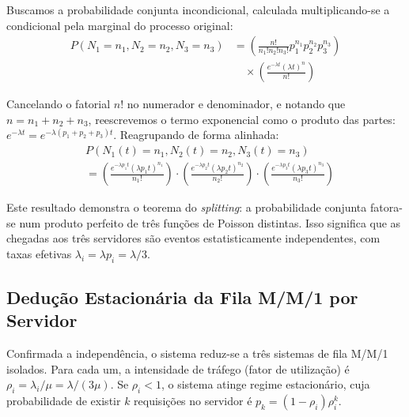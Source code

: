 \documentclass[conference]{IEEEtran}
\begin{document}
Buscamos a probabilidade conjunta incondicional, calculada multiplicando-se a condicional pela marginal do processo original:
\begin{align}
P(N_1=n_1, N_2=n_2, N_3=n_3) &= \left( \frac{n!}{n_1! n_2! n_3!} p_1^{n_1} p_2^{n_2} p_3^{n_3} \right) \nonumber \\
&\quad \times \left( \frac{e^{-\lambda t}(\lambda t)^n}{n!} \right)
\end{align}

Cancelando o fatorial $n!$ no numerador e denominador, e notando que $n = n_1 + n_2 + n_3$, reescrevemos o termo exponencial como o produto das partes: $e^{-\lambda t} = e^{-\lambda(p_1 + p_2 + p_3)t}$. Reagrupando de forma alinhada:
\begin{align}
& P(N_1(t)=n_1, N_2(t)=n_2, N_3(t)=n_3) \nonumber \\
& = \left( \frac{e^{-\lambda p_1 t}(\lambda p_1 t)^{n_1}}{n_1!} \right) \cdot \left( \frac{e^{-\lambda p_2 t}(\lambda p_2 t)^{n_2}}{n_2!} \right) \cdot \left( \frac{e^{-\lambda p_3 t}(\lambda p_3 t)^{n_3}}{n_3!} \right)
\end{align}

Este resultado demonstra o teorema do \textit{splitting}: a probabilidade conjunta fatora-se num produto perfeito de três funções de Poisson distintas. Isso significa que as chegadas aos três servidores são eventos estatisticamente independentes, com taxas efetivas $\lambda_i = \lambda p_i = \lambda / 3$.

\subsection{Dedução Estacionária da Fila M/M/1 por Servidor}

Confirmada a independência, o sistema reduz-se a três sistemas de fila M/M/1 isolados. Para cada um, a intensidade de tráfego (fator de utilização) é $\rho_i = \lambda_i / \mu = \lambda / (3\mu)$. Se $\rho_i < 1$, o sistema atinge regime estacionário, cuja probabilidade de existir $k$ requisições no servidor é $p_k = (1-\rho_i)\rho_i^k$.
\end{document}
